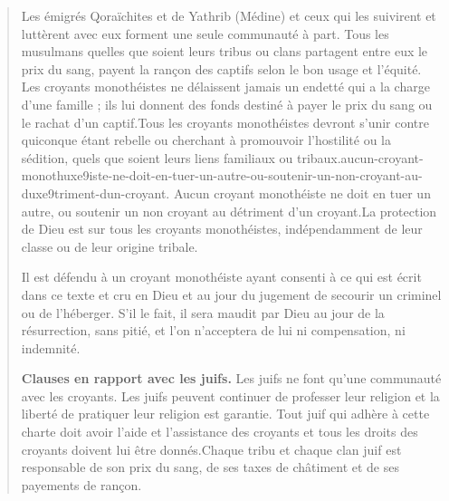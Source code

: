 \begin{quote}
 \begin{footnotesize}
 
 
{Les émigrés Qoraïchites et de Yathrib (Médine) et ceux
qui les suivirent et luttèrent avec eux forment une seule communauté à
part. Tous les musulmans quelles que soient leurs tribus ou
clans partagent entre eux le prix du sang, payent la rançon des captifs
selon le bon usage et
l'équité.
Les croyants monothéistes ne délaissent jamais un endetté
qui a la charge d'une famille ; ils lui donnent des fonds destiné à
payer le prix du sang ou le rachat d'un
captif.Tous les croyants monothéistes devront s'unir contre
quiconque étant rebelle ou cherchant à promouvoir l'hostilité ou la
sédition, quels que soient leurs liens familiaux ou
tribaux.aucun-croyant-monothuxe9iste-ne-doit-en-tuer-un-autre-ou-soutenir-un-non-croyant-au-duxe9triment-dun-croyant. Aucun croyant monothéiste ne doit en tuer un autre, ou
soutenir un non croyant au détriment d'un
croyant.La protection de Dieu est sur tous les croyants
monothéistes, indépendamment de leur classe ou de leur origine
tribale.} 
 
 
{Il est défendu à un croyant monothéiste ayant consenti à
ce qui est écrit dans ce texte et cru en Dieu et au jour du jugement de
secourir un criminel ou de l'héberger. S'il le fait, il sera maudit par
Dieu au jour de la résurrection, sans pitié, et l'on n'acceptera de lui
ni compensation, ni
indemnité.}
 
{\textbf{Clauses en rapport avec les
juifs.} Les juifs ne font qu'une communauté avec les
croyants. Les juifs peuvent continuer de professer leur religion et
la liberté de pratiquer leur religion est
garantie.   Tout juif qui adhère à cette charte doit avoir l'aide et
l'assistance des croyants et tous les droits des croyants doivent lui
être
donnés.Chaque tribu et chaque clan juif est responsable de son
prix du sang, de ses taxes de châtiment et de ses payements de
rançon.} 
 

\end{footnotesize}
\end{quote}
